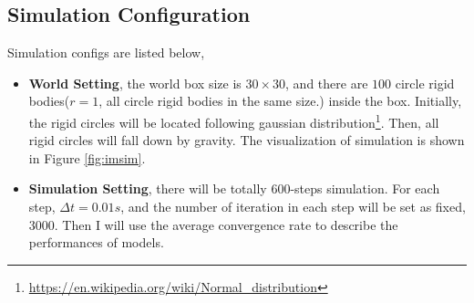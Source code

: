 \subsection{Simulation Configuration}
Simulation configs are listed below,
    \label{simconfig}
    \begin{itemize}
        \item \textbf{World Setting}, the world box size is $30\times30$,   and there are $100$ circle rigid bodies($r=1$, all circle rigid bodies in the same size.) inside the box. Initially, the rigid circles will be located following gaussian distribution\footnote{\url{https://en.wikipedia.org/wiki/Normal_distribution}}. Then, all rigid circles will fall down by gravity. The visualization of simulation is shown in Figure \ref{fig:imsim}.
        \item \textbf{Simulation Setting}, there will be totally $600$-steps simulation. For each step, $\Delta t = 0.01s$, and the number of iteration in each step will be set as fixed, $3000$. Then I will use the average convergence rate to describe the performances of models.
    \end{itemize}
